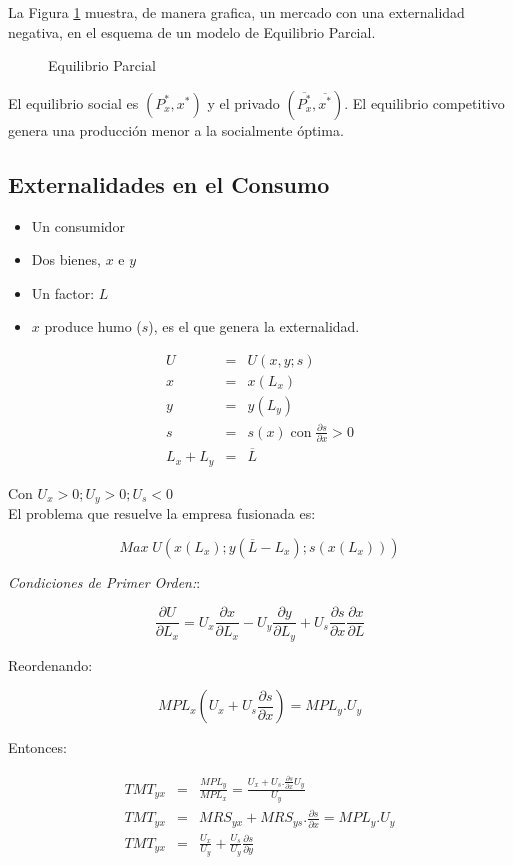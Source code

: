 La Figura \ref{fig:grafico3} muestra, de manera grafica, un mercado con una externalidad negativa, en el esquema de un modelo de Equilibrio Parcial.

\begin {figure}
\caption{Equilibrio Parcial}
	\centering
	\label{fig:grafico3}
\end{figure}

El equilibrio social es $(P^*_x, x^*)$ y el privado $(\overline{P^*_x}, \overline{x^*})$. El equilibrio competitivo genera una producción menor a la socialmente óptima.


\subsection {Externalidades en el Consumo}

\begin{itemize}
 \item Un consumidor
 \item Dos bienes, $x$ e $y$
 \item Un factor: $L$
 \item $x$ produce humo ($s$), es el que genera la externalidad.
\end{itemize}

\begin{eqnarray*}
 U &=& U(x,y;s) \\
 x &=& x(L_x) \\
 y &=& y(L_y) \\
 s &=& s(x) \; \mbox{con} \; \frac{\partial s}{\partial x}>0 \\
 L_x+L_y &=& \overline{L}
\end{eqnarray*}

Con $U_x>0; U_y>0; U_s<0$\\

El problema que resuelve la empresa fusionada es:

$$Max \; U(x(L_x);y(\overline{L}-L_x);s(x(L_x)))$$

\emph{Condiciones de Primer Orden:}:

$$\frac{\partial U}{\partial{L_x}}=U_x \frac{\partial
x}{\partial{L_x}}-U_y\frac{\partial y}{\partial{L_y}}+U_s
\frac{\partial s}{\partial{x}} \frac{\partial x}{\partial{L}} $$

Reordenando:

$$ MPL_x(U_x+U_s \frac{\partial s}{\partial{x}})=MPL_y.U_y$$

Entonces:

\begin{eqnarray*}
	TMT_{yx} &=& \frac{MPL_y}{MPL_x} = \frac{U_x+U_s.\frac{\partial
s}{\partial x}{U_y}}{U_y} \\
	TMT_{yx} &=& MRS_{yx}+MRS_{ys}.\frac{\partial
 s}{\partial{x}}=MPL_y.U_y \\
	TMT_{yx} &=& \frac{U_x}{U_y}+\frac{U_s}{U_y}\frac{\partial s}{\partial y}
\end{eqnarray*}

